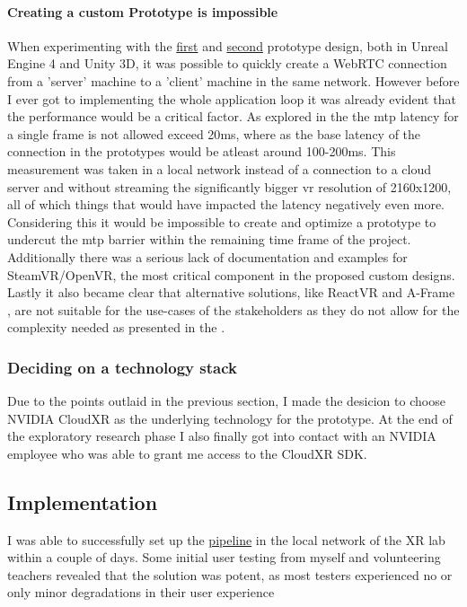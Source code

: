 \paragraph{Creating a custom Prototype is impossible}
When experimenting with the \hyperref[fig:pr11]{first} and \hyperref[fig:pr12]{second} prototype design, both in Unreal Engine 4 and Unity 3D, it was possible to quickly create a WebRTC connection from a 'server' machine to a 'client' machine in the same network. However before I ever got to implementing the whole application loop it was already evident that the performance would be a critical factor. As explored in the  the \acrfull{mtp} latency for a single frame is not allowed exceed 20\acrshort{ms}, where as the base latency of the connection in the prototypes would be atleast around 100-200\acrshort{ms}. This measurement was taken in a local network instead of a connection to a cloud server and without streaming the significantly bigger \acrshort{vr} resolution of 2160x1200, all of which things that would have impacted the latency negatively even more. Considering this it would be impossible to create and optimize a prototype to undercut the \acrshort{mtp} barrier within the remaining time frame of the project. Additionally there was a serious lack of documentation and examples for SteamVR/OpenVR, the most critical component in the proposed custom designs. Lastly it also became clear that alternative solutions, like ReactVR \parencite{reactVR} and A-Frame \parencite{aframe}, are not suitable for the use-cases of the stakeholders as they do not allow for the complexity needed as presented in the . \\

\subsubsection{Deciding on a technology stack}
Due to the points outlaid in the previous section, I made the desicion to choose NVIDIA CloudXR as the underlying technology for the prototype. At the end of the exploratory research phase I also finally got into contact with an NVIDIA employee who was able to grant me access to the CloudXR SDK.

\subsection{Implementation}
I was able to successfully set up the \hyperref[fig:pr0]{pipeline} in the local network of the XR lab within a couple of days. Some initial user testing from myself and volunteering teachers revealed that the solution was potent, as most testers experienced no or only minor degradations in their user experience

